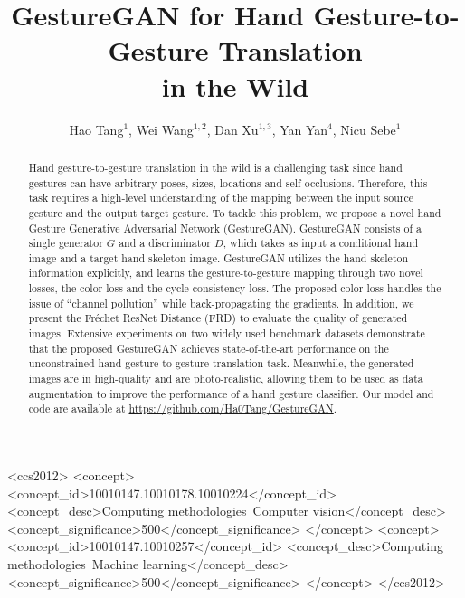 \documentclass[sigconf]{acmart}
\begin{document}
\title{GestureGAN for Hand Gesture-to-Gesture Translation\\ in the Wild}

\author{Hao Tang$^1$, \quad Wei Wang$^{1,2}$, \quad Dan Xu$^{1,3}$, \quad Yan Yan$^4$, \quad Nicu Sebe$^1$}

\begin{abstract}
	
Hand gesture-to-gesture translation in the wild is a challenging task since hand gestures can have arbitrary poses, sizes, locations and self-occlusions. 
Therefore, this task requires a high-level understanding of the mapping between the input source gesture and the output target gesture.
To tackle this problem, we propose a novel hand Gesture Generative Adversarial Network (GestureGAN). 
GestureGAN consists of a single generator $G$ and a discriminator $D$, which takes as input a conditional hand image and a target hand skeleton image. 
GestureGAN utilizes the hand skeleton information explicitly, and learns the gesture-to-gesture mapping through two novel losses, the color loss and the cycle-consistency loss. 
The proposed color loss handles the issue of ``channel pollution'' while back-propagating the gradients.
In addition, we present the Fr\'echet ResNet Distance (FRD) to evaluate the quality of generated images.
Extensive experiments on two widely used benchmark datasets demonstrate that the proposed GestureGAN achieves state-of-the-art performance on the unconstrained hand gesture-to-gesture translation task. 
Meanwhile, the generated images are in high-quality and are photo-realistic, allowing them to be used as data augmentation to improve the performance of a hand gesture classifier. 
Our model and code are available at \url{https://github.com/Ha0Tang/GestureGAN}.
	
\end{abstract}

\begin{CCSXML}
	<ccs2012>
	<concept>
	<concept_id>10010147.10010178.10010224</concept_id>
	<concept_desc>Computing methodologies~Computer vision</concept_desc>
	<concept_significance>500</concept_significance>
	</concept>
	<concept>
	<concept_id>10010147.10010257</concept_id>
	<concept_desc>Computing methodologies~Machine learning</concept_desc>
	<concept_significance>500</concept_significance>
	</concept>
	</ccs2012>
\end{CCSXML}
\end{document}

